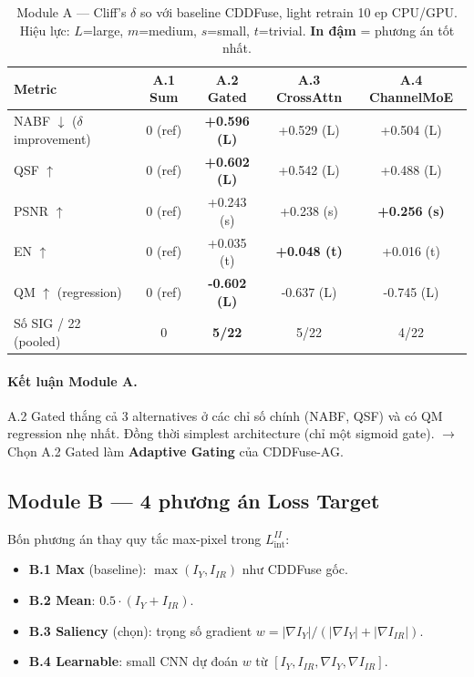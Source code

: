 \begin{table}[h]
\centering
\small
\caption{Module A --- Cliff's $\delta$ so với baseline CDDFuse, light retrain 10 ep CPU/GPU. Hiệu lực: $L$=large, $m$=medium, $s$=small, $t$=trivial. \textbf{In đậm} = phương án tốt nhất.}
\label{tab:app-moduleA}
\begin{tabular}{lcccc}
\toprule
\textbf{Metric} & A.1 Sum & A.2 Gated & A.3 CrossAttn & A.4 ChannelMoE \\
\midrule
NABF $\downarrow$ ($\delta$ improvement) & 0 (ref) & \textbf{+0.596 (L)} & +0.529 (L) & +0.504 (L) \\
QSF $\uparrow$                  & 0 (ref) & \textbf{+0.602 (L)} & +0.542 (L) & +0.488 (L) \\
PSNR $\uparrow$                 & 0 (ref) & +0.243 (s) & +0.238 (s) & \textbf{+0.256 (s)} \\
EN $\uparrow$                   & 0 (ref) & +0.035 (t) & \textbf{+0.048 (t)} & +0.016 (t) \\
QM $\uparrow$ (regression)      & 0 (ref) & \textbf{-0.602 (L)} & -0.637 (L) & -0.745 (L) \\
\midrule
Số SIG / 22 (pooled) & 0 & \textbf{5/22} & 5/22 & 4/22 \\
\bottomrule
\end{tabular}
\end{table}

\paragraph{Kết luận Module A.}
A.2 Gated thắng cả 3 alternatives ở các chỉ số chính (NABF, QSF) và có QM regression nhẹ nhất. Đồng thời simplest architecture (chỉ một sigmoid gate). $\to$ Chọn A.2 Gated làm \textbf{Adaptive Gating} của CDDFuse-AG.

\subsection{Module B --- 4 phương án Loss Target}
\label{app:moduleB-ablation}

Bốn phương án thay quy tắc max-pixel trong $L_{\mathrm{int}}^{II}$:
\begin{itemize}\itemsep0pt
    \item \textbf{B.1 Max} (baseline): $\max(I_Y, I_{IR})$ như CDDFuse gốc.
    \item \textbf{B.2 Mean}: $0.5 \cdot (I_Y + I_{IR})$.
    \item \textbf{B.3 Saliency} (chọn): trọng số gradient $w = |\nabla I_Y| / (|\nabla I_Y| + |\nabla I_{IR}|)$.
    \item \textbf{B.4 Learnable}: small CNN dự đoán $w$ từ $[I_Y, I_{IR}, \nabla I_Y, \nabla I_{IR}]$.
\end{itemize}

